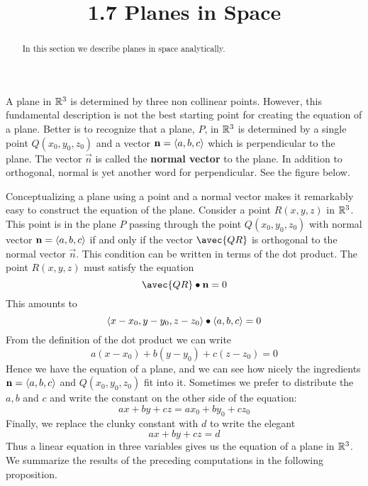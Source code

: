 \documentclass[handout]{ximera}
\title{1.7 Planes in Space}
\begin{document}
\begin{abstract}
In this section we describe planes in space analytically.
\end{abstract}
 
\maketitle

A plane in $\mathbb R^3$ is determined by three non collinear points. 
However, this fundamental description is not the best starting point for creating the equation of a plane.
Better is to recognize that a plane, $P$, in $\mathbb R^3$ is determined by a single point $Q(x_0, y_0, z_0)$ and a 
vector $\mathbf{n} = \left\langle a, b, c\right\rangle$ which is perpendicular to the plane. 
The vector $\vec{n}$ is called the \textbf{normal vector} to the plane.
In addition to orthogonal, normal is yet another word for perpendicular.
See the figure below.

\begin{image}
\end{image}

Conceptualizing a plane using a point and a normal vector makes it remarkably easy to construct the equation of the plane.
Consider a point $R(x, y, z)$ in $\mathbb R^3$.
This point is in the plane $P$ passing through the point $Q(x_0, y_0, z_0)$ with normal vector $\mathbf{n} =\left\langle a, b, c\right\rangle$
if and only if the vector $\avec{QR}$ is orthogonal to the normal vector $\vec{n}$.
This condition can be written in terms of the dot product.
The point $R(x, y, z)$ must satisfy the equation
\[
\avec{QR} \dotp \vec{n} = 0
\]
This amounts to 
\[
\left\langle x - x_0, y-y_0, z-z_0\right\rangle \bullet \left\langle a, b, c\right\rangle = 0
\]
From the definition of the dot product we can write
\[
a(x-x_0) + b(y-y_0) + c(z-z_0) = 0
\]
Hence we have the equation of a plane, and we can see how nicely the ingredients $\mathbf{n} = \left\langle a,b,c\right\rangle$
and $Q(x_0, y_0, z_0)$ fit into it.
Sometimes we prefer to distribute the $a, b$ and $c$ and write the constant on the other side of the equation:
\[
ax + by + cz = ax_0 + by_0 + cz_0
\]
Finally, we replace the clunky constant with $d$ to write the elegant
\[
ax + by + cz = d
\]
Thus a linear equation in three variables gives us the equation of a plane in $\mathbb R^3$.
We summarize the results of the preceding computations in the following proposition.
\end{document}
